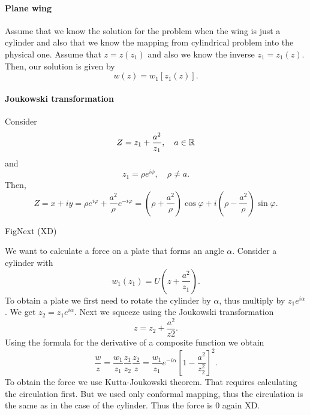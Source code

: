 \documentclass[../main.tex]{subfiles}
\begin{document}
  \paragraph{Plane wing}

  Assume that we know the solution for the problem when the wing is just a cylinder
  and also that we know the mapping from cylindrical problem into the physical one.
  Assume that $z = z(z_1)$ and also we know the inverse $z_1 = z_1(z)$.
  Then, our solution is given by
  \begin{displaymath}
    w(z) = w_1[z_1(z)].
  \end{displaymath}
  
  \paragraph{Joukowski transformation}
  Consider
  \begin{displaymath}
    Z = z_1 + \frac{a^2}{z_1}, \quad a \in \mathbb{R}
  \end{displaymath}
  and
  \begin{displaymath}
    z_1 = \rho e^{i \phi}, \quad \rho \neq a.
  \end{displaymath}
  Then,
  \begin{displaymath}
    Z = x + iy 
    = \rho e^{i \varphi} + \frac{a^2}{\rho} e^{-i \varphi} 
    = \left( \rho + \frac{a^2}{\rho} \right) \cos \varphi + i\left( \rho - \frac{a^2}{\rho} \right) \sin \varphi.
  \end{displaymath}
  
  \todo FigNext (XD)

  We want to calculate a force on a plate that forms an angle $\alpha$.
  Consider a cylinder with
  \begin{displaymath}
    w_1(z_1) = U\left(z + \frac{a^2}{z_1}\right).
  \end{displaymath}
  To obtain a plate we first need to rotate the cylinder by $\alpha$, thus multiply by $z_1e^{i \alpha}$.
  We get $z_2 = z_1 e^{i\alpha}$. Next we squeeze using the Joukowski transformation
  \begin{displaymath}
    z = z_2 + \frac{a^2}{z2}.
  \end{displaymath}
  Using the formula for the derivative of a composite function we obtain
  \begin{displaymath}
    \dfrac{w}{z} = \dfrac{w_1}{z_1} \dfrac{z_1}{z_2}\dfrac{z_2}{z} = \dfrac{w_1}{z_1} e^{-i\alpha} \left[ 1 - \frac{a^2}{z_2^2} \right]^2.
  \end{displaymath}
  To obtain the force we use Kutta-Joukowski theorem.
  That requires calculating the circulation first.
  But we used only conformal mapping, thus the circulation is the same as in the case of the cylinder.
  Thus the force is 0 again XD.
\end{document}
